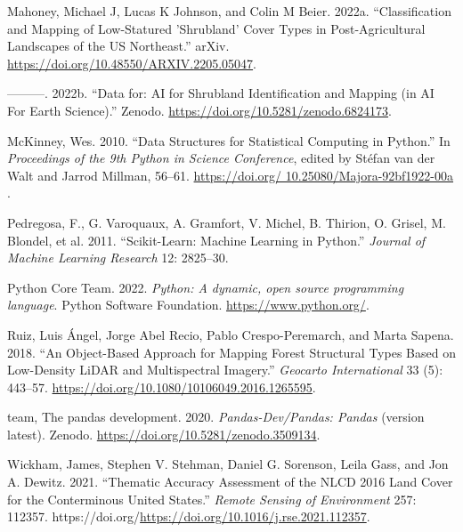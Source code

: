 \documentclass[
  letterpaper,
  DIV=11,
  numbers=noendperiod]{scrartcl}
\newlength{\cslhangindent}
\newlength{\cslentryspacingunit} %
\newenvironment{CSLReferences}[2] %
 {%
  \setlength{\parindent}{0pt}
  \ifodd #1
  \let\oldpar\par
  \def\par{\hangindent=\cslhangindent\oldpar}
  \fi
  \setlength{\parskip}{#2\cslentryspacingunit}
 }%
 {}
\begin{document}
\begin{CSLReferences}{1}{0}
\leavevmode{}%
Mahoney, Michael J, Lucas K Johnson, and Colin M Beier. 2022a.
{``Classification and Mapping of Low-Statured 'Shrubland' Cover Types in
Post-Agricultural Landscapes of the US Northeast.''} arXiv.
\url{https://doi.org/10.48550/ARXIV.2205.05047}.

\leavevmode{}%
---------. 2022b. {``{Data for: AI for Shrubland Identification and
Mapping (in AI For Earth Science)}.''} Zenodo.
\url{https://doi.org/10.5281/zenodo.6824173}.

\leavevmode{}%
McKinney, Wes. 2010. {``{D}ata {S}tructures for {S}tatistical
{C}omputing in {P}ython.''} In \emph{{P}roceedings of the 9th {P}ython
in {S}cience {C}onference}, edited by Stéfan van der Walt and Jarrod
Millman, 56--61.
\href{https://doi.org/\%2010.25080/Majora-92bf1922-00a\%20}{https://doi.org/
10.25080/Majora-92bf1922-00a }.

\leavevmode{}%
Pedregosa, F., G. Varoquaux, A. Gramfort, V. Michel, B. Thirion, O.
Grisel, M. Blondel, et al. 2011. {``Scikit-Learn: Machine Learning in
{P}ython.''} \emph{Journal of Machine Learning Research} 12: 2825--30.

\leavevmode{}%
Python Core Team. 2022. \emph{{Python: A dynamic, open source
programming language}}. {Python Software Foundation}.
\url{https://www.python.org/}.

\leavevmode{}%
Ruiz, Luis Ángel, Jorge Abel Recio, Pablo Crespo-Peremarch, and Marta
Sapena. 2018. {``An Object-Based Approach for Mapping Forest Structural
Types Based on Low-Density LiDAR and Multispectral Imagery.''}
\emph{Geocarto International} 33 (5): 443--57.
\url{https://doi.org/10.1080/10106049.2016.1265595}.

\leavevmode{}%
team, The pandas development. 2020. \emph{Pandas-Dev/Pandas: Pandas}
(version latest). Zenodo. \url{https://doi.org/10.5281/zenodo.3509134}.

\leavevmode{}%
Wickham, James, Stephen V. Stehman, Daniel G. Sorenson, Leila Gass, and
Jon A. Dewitz. 2021. {``Thematic Accuracy Assessment of the NLCD 2016
Land Cover for the Conterminous United States.''} \emph{Remote Sensing
of Environment} 257: 112357.
https://doi.org/\url{https://doi.org/10.1016/j.rse.2021.112357}.

\end{CSLReferences}
\end{document}

